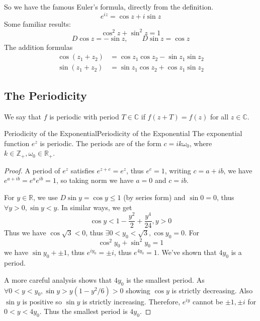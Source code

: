 \documentclass[../main.tex]{subfiles}
\begin{document}
So we have the famous Euler's formula, directly from the definition.
\begin{equation}
	e^{iz} = \cos z + i \sin z
\end{equation}
Some familiar results:
\begin{equation*}
	\cos ^2z + \sin ^2z = 1
\end{equation*}
\begin{equation*}
D \cos z = -\sin z, \qquad D \sin z = \cos z
\end{equation*}
The addition formulas
\begin{equation*}
\begin{aligned}
	\cos (z_1+z_2) &= \cos z_1 \cos z_2 - \sin z_1 \sin z_2\\
	\sin (z_1+z_2) &= \sin z_1 \cos z_2 + \cos z_1 \sin z_2
\end{aligned}
\end{equation*}

\subsection{The Periodicity}
We say that  $f$ is periodic with period $T\in \mathbb{C}$ if $f(z+T) = f(z)$ for all $z\in \mathbb{C}$.

\begin{theorem}{Periodicity of the Exponential}{Periodicity of the Exponential}
	The exponential function $e^{z}$ is periodic. The periods are of the form $c =i k \omega_0$, where $k\in \mathbb{Z}_+, \omega_0\in \mathbb{R}_+$.
\end{theorem}
\begin{proof}
	A period of $e^{z}$ satisfies $e^{z+c} = e^{z}$, thus $e^{c}=1$, writing $c = a+ib$, we have $e^{a+ib} = e^ae^{ib} = 1$, so taking norm we have $a=0$ and $c=ib$.

	For $y\in \mathbb{R}$, we use $D \sin y = \cos y \leq 1$ (by series form) and $\sin 0=0$, thus $\forall y>0,\sin y<y$. In similar ways, we get
	\begin{equation*}
		\cos y < 1 - \frac{y^2}{2} + \frac{y^4}{24}, y>0
	\end{equation*}
	Thus we have $\cos \sqrt{3} <0$, thus $\exists 0<y_0<\sqrt{3},\cos y_0=0$. For
	\begin{equation*}
	\cos ^2y_0+\sin ^2y_0=1
	\end{equation*}
	we have $\sin y_0+ \pm 1$, thus $e^{iy_0} = \pm i$, thus $e^{4y_0}=1$. We've shown that $4y_0$ is a period.

	A more careful analysis shows that $4y_0$ is the smallest period. As $\forall 0<y<y_0,\sin y>y(1-y^2 /6)>0$ showing $\cos y$ is strictly decreasing. Also $\sin y$ is positive so $\sin y$ is strictly increasing. Therefore, $e^{iy}$ cannot be $\pm 1,\pm i$ for $0<y<4y_0$. Thus the smallest period is $4y_0$.
\end{proof}
\end{document}
